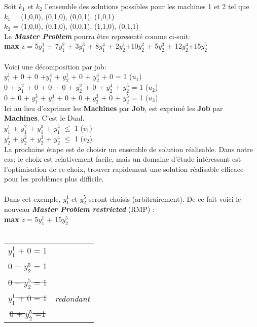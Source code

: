 Soit \textit{$k_1$} et \textit{$k_2$} l'ensemble des solutions possibles pour les machines 1 et 2 tel que
\\
\textit{$k_1$} = { (1,0,0), (0,1,0), (0,0,1), (1,0,1)} \\
\textit{$k_2$} = {  (1,0,0), (0,1,0), (0,0,1), (1,1,0), (0,1,1)} \\ 

Le \textbf{\textit{Master Problem}} pourra être representé comme ci-suit:
\\
\textbf{max} z = 5$y_1^1$ + 7$y_1^2$ + 3$y_1^3$ + 8$y_1^4$ + 2$y_2^1$+10$y_2^2$ + 5$y_2^3$ + 12$y_2^4$+15$y_2^5$
\\ \\
Voici une décomposition par job: \\
$y_1^1$ + 0 + 0 +$y_1^4$ + $y_2^1$  + 0 + $y_2^4$ + 0 = 1 (\textit{$u_1$}) \\
0 + $y_1^2$ + 0 + 0 + 0 + $y_2^2$ + 0 + $y_2^4$ + $y_2^5$ = 1 (\textit{$u_2$}) \\
0 + 0 + $y_1^3$ + $y_1^4$ + 0 + 0 + $y_2^3$ + 0 + $y_2^5$ = 1     (\textit{$u_3$}) \\

Ici au lieu d'exprimer les \textbf{Machines} par \textbf{Job}, est exprimé les \textbf{Job} par \textbf{Machines}. C'est le Dual.\\
$y_1^1$ + $y_1^2$ + $y_1^3$ + $y_1^4$ $\leq$ 1 (\textit{$v_1$}) \\
$y_2^1$ + $y_2^2$ + $y_2^3$ + $y_2^4$ $\leq$ 1 (\textit{$v_2$}) \\

La prochaine étape est de choisir un ensemble de solution réalisable. Dans notre cas; le choix est relativement facile, mais un domaine d'étude intéressant est l'optimisation de ce choix, trouver rapidement une solution réalisable efficace pour les problèmes plus difficile.
\\
\\
Dans cet exemple, $y_1^1$ et $y_2^5$ seront choisis (arbitrairement). De ce fait voici le nouveau \textbf{\textit{Master Problem restricted}} (RMP) : \\
\textbf{max} \textit{z} = 5$y_1^1$  + 15$y_2^5$ 
\\ \\
\begin{tabular}{c c }
$y_1^1$  + 0 = 1 & \\
0 + $y_2^5$ = 1 & \\
\sout{0 + $y_2^5$ = 1} & \\
\sout{$y_1^1$  + 0 = 1} & \textit{redondant}\\
\sout{0 + $y_2^5$ =1} & \\ 
\end{tabular} 

